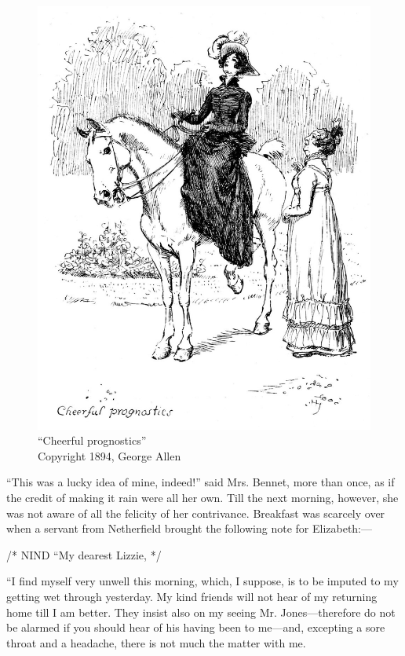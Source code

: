 \begin{figure}[htbp]
    \centering
    \includegraphics[width=\textwidth]{illustrations/i_069.jpg}
    \caption{“Cheerful prognostics”\\ Copyright 1894, George Allen}
    \label{fig:image}
\end{figure}


``This was a lucky idea of mine, indeed!'' said Mrs. Bennet, more than once, as if the credit of making it rain were all her own. Till the next morning, however, she was not aware of all the felicity of her contrivance. Breakfast was scarcely over when a servant from Netherfield brought the following note for Elizabeth:---

/* NIND ``My dearest Lizzie, */

``I find myself very unwell this morning, which, I suppose, is to be imputed to my getting wet through yesterday. My kind friends will not hear of my returning home till I am better. They insist also on my seeing Mr. Jones---therefore do not be alarmed if you should hear of his having been to me---and, excepting a sore throat and a headache, there is not much the matter with me.

